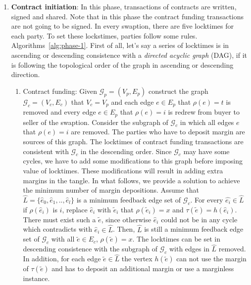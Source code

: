 \begin{enumerate}
    \item \textbf{Contract initiation}: In this phase, transactions of contracts are written, signed and shared.
    Note that in this phase the contract funding transactions are not going to be signed. In every swaption, there are five locktimes for each party. To set these lockstimes, parties follow some rules. Algorithms~\ref{alg:phase-1}. First of all, let's say a series of locktimes is in ascending or descending consistence with a \emph{directed acyclic graph} (DAG), if it is following the topological order of the graph in ascending or descending direction.
    
    \begin{enumerate}
        \item Contract funding: Given $\mathcal{G}_{p}=(V_p, E_p)$ construct the graph $\mathcal{G}_{c}=(V_c, E_c)$ that $V_c = V_p$ and each edge $e \in E_p$ that $\rho(e) = t$ is removed and every edge $e \in E_p$ that $\rho(e) = i$ is redrew from buyer to seller of the swaption. Consider the subgraph of $\mathcal{G}_{c}$ in which all edges $e$ that $\rho(e)=i$ are removed. The parties who have to deposit margin are sources of this graph. 
        The locktimes of contract funding transactions are consistent with $\mathcal{G}_{c}$ in the descending order. Since $\mathcal{G}_c$ may have some cycles, we have to add some modifications to this graph before imposing value of locktimes. These modifications will result in adding extra margins in the tangle. In what follows, we provide a solution to achieve the minimum number of margin depositions. Assume that $\hat{L}=\{\hat{e}_0, \hat{e}_1, .., \hat{e}_l\}$ is a minimum feedback edge set of $\mathcal{G}_{c}$. For every $\hat{e_i} \in \hat{L}$ if $\rho(\hat{e}_i)$ is $i$, replace $\hat{e}_i$ with $\tilde{e}_i$ that $\rho(\tilde{e}_i) = x$ and $\tau(\tilde{e}) = h(\hat{e}_i)$. There must exist such a $\tilde{e}$, since otherwise $\hat{e}_i$ could not be in any cycle which contradicts with $\hat{e}_i \in \hat{L}$. Then, $\hat{L}$ is still a minimum feedback edge set of $\mathcal{G}_{c}$ with all $\tilde{e} \in E_c$, $\rho(\tilde{e}) = x$. 
        The locktimes can be set in descending consistence with the subgraph of $\mathcal{G}_{c}$ with edges in $\hat{L}$ removed.
        In addition, for each edge $\tilde{e} \in \hat{L}$ the vertex $h(\tilde{e})$ can not use the margin of $\tau(\tilde{e})$ and has to deposit an additional margin or use a marginless instance.
        

\end{enumerate}
\end{enumerate}
